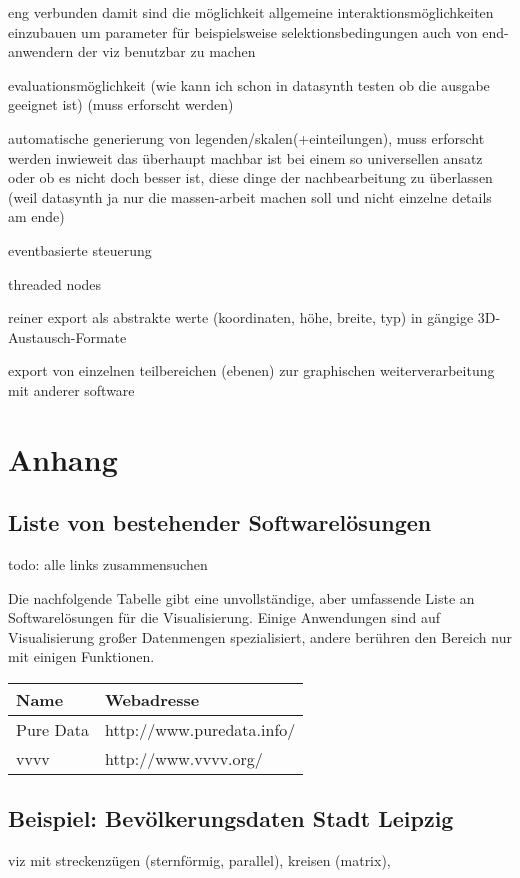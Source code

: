 \documentclass[a4paper, 12pt, DIVcalc, onepage, pdftex, headsepline, footsepline]{scrreprt}
\begin{document}
eng verbunden damit sind die möglichkeit allgemeine interaktionsmöglichkeiten einzubauen um parameter für beispielsweise selektionsbedingungen auch von end-anwendern der viz benutzbar zu machen

evaluationsmöglichkeit (wie kann ich schon in datasynth testen ob die ausgabe geeignet ist) (muss erforscht werden)

automatische generierung von legenden/skalen(+einteilungen), muss erforscht werden inwieweit das überhaupt machbar ist bei einem so universellen ansatz oder ob es nicht doch besser ist, diese dinge der nachbearbeitung zu überlassen (weil datasynth ja nur die massen-arbeit machen soll und nicht einzelne details am ende)

eventbasierte steuerung

threaded nodes

reiner export als abstrakte werte (koordinaten, höhe, breite, typ) in gängige 3D-Austausch-Formate

export von einzelnen teilbereichen (ebenen) zur graphischen weiterverarbeitung mit anderer software

\chapter{Anhang}
\section{Liste von bestehender Softwarelösungen}
todo: alle links zusammensuchen

Die nachfolgende Tabelle gibt eine unvollständige, aber umfassende
Liste an Softwarelösungen für die Visualisierung. Einige Anwendungen
sind auf Visualisierung großer Datenmengen spezialisiert, andere
berühren den Bereich nur mit einigen Funktionen.

\begin{tabular}{l|l}
\hline
Name & Webadresse \\
\hline
Pure Data & http://www.puredata.info/ \\
vvvv & http://www.vvvv.org/ \\
\end{tabular}
\section{Beispiel: Bevölkerungsdaten Stadt Leipzig}
viz mit streckenzügen (sternförmig, parallel), kreisen (matrix),



\listoftables
\listoffigures
\end{document}
